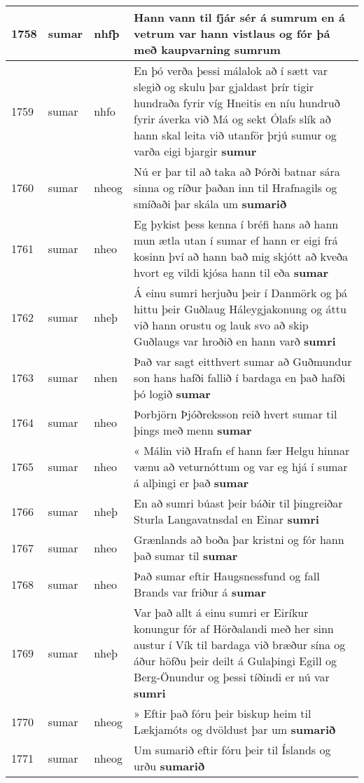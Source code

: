 \documentclass{article}
\begin{document}
\begin{longtable}{p{1cm}|p{1cm}|p{1cm}|p{13cm}}
\hline
1758&sumar&nhfþ&Hann vann til fjár sér á sumrum en á vetrum var hann vistlaus og fór þá með kaupvarning \textbf{sumrum} \\
\hline
1759&sumar&nhfo&En þó verða þessi málalok að í sætt var slegið og skulu þar gjaldast þrír tigir hundraða fyrir víg Hneitis en níu hundruð fyrir áverka við Má og sekt Ólafs slík að hann skal leita við utanför þrjú sumur og varða eigi bjargir \textbf{sumur} \\
\hline
1760&sumar&nheog&Nú er þar til að taka að Þórði batnar sára sinna og ríður þaðan inn til Hrafnagils og smíðaði þar skála um \textbf{sumarið} \\
\hline
1761&sumar&nheo&Eg þykist þess kenna í bréfi hans að hann mun ætla utan í sumar ef hann er eigi frá kosinn því að hann bað mig skjótt að kveða hvort eg vildi kjósa hann til eða \textbf{sumar} \\
\hline
1762&sumar&nheþ&Á einu sumri herjuðu þeir í Danmörk og þá hittu þeir Guðlaug Háleygjakonung og áttu við hann orustu og lauk svo að skip Guðlaugs var hroðið en hann varð \textbf{sumri} \\
\hline
1763&sumar&nhen&Það var sagt eitthvert sumar að Guðmundur son hans hafði fallið í bardaga en það hafði þó logið \textbf{sumar} \\
\hline
1764&sumar&nheo&Þorbjörn Þjóðreksson reið hvert sumar til þings með menn \textbf{sumar} \\
\hline
1765&sumar&nheo&« Málin við Hrafn ef hann fær Helgu hinnar vænu að veturnóttum og var eg hjá í sumar á alþingi er það \textbf{sumar} \\
\hline
1766&sumar&nheþ&En að sumri búast þeir báðir til þingreiðar Sturla Langavatnsdal en Einar \textbf{sumri} \\
\hline
1767&sumar&nheo&Grænlands að boða þar kristni og fór hann það sumar til \textbf{sumar} \\
\hline
1768&sumar&nheo&Það sumar eftir Haugsnessfund og fall Brands var friður á \textbf{sumar} \\
\hline
1769&sumar&nheþ&Var það allt á einu sumri er Eiríkur konungur fór af Hörðalandi með her sinn austur í Vík til bardaga við bræður sína og áður höfðu þeir deilt á Gulaþingi Egill og Berg-Önundur og þessi tíðindi er nú var \textbf{sumri} \\
\hline
1770&sumar&nheog&» Eftir það fóru þeir biskup heim til Lækjamóts og dvöldust þar um \textbf{sumarið} \\
\hline
1771&sumar&nheog&Um sumarið eftir fóru þeir til Íslands og urðu \textbf{sumarið} \\

\end{longtable}
\end{document}
